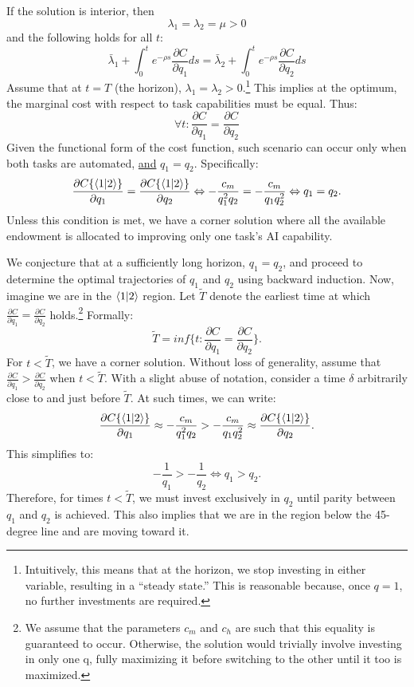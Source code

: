 \documentclass{article}
\theoremstyle{plain}
\theoremstyle{plain}
\begin{document}
If the solution is interior, then %
\[
\lambda_{1}=\lambda_{2}=\mu>0
\]
and the following holds for all $t$:
\[
\bar{\lambda}_{1}+\int_{0}^{t}e^{-\rho s}\frac{\partial C}{\partial q_{1}}ds=\bar{\lambda}_{2}+\int_{0}^{t}e^{-\rho s}\frac{\partial C}{\partial q_{2}}ds
\]
Assume that at $t=T$ (the horizon), $\lambda_{1}=\lambda_{2}>0$.\footnote{Intuitively, this means that at the horizon, we stop investing in either variable, resulting in a ``steady state.'' 
This is reasonable because, once $q=1$, no further investments are required.} 
This implies at the optimum, the marginal cost with respect to task capabilities must be equal. 
Thus:
\[
\forall t:\frac{\partial C}{\partial q_{1}}=\frac{\partial C}{\partial q_{2}}
\]
Given the functional form of the cost function, such scenario can occur only when both tasks are automated, \underline{and} $q_{1}=q_{2}$. 
Specifically:
\[
\frac{\partial C\{\langle 1|2 \rangle\}}{\partial q_{1}}=\frac{\partial C\{\langle 1|2 \rangle\}}{\partial q_{2}}\Leftrightarrow-\frac{c_{m}}{q_{1}^{2}q_{2}}=-\frac{c_{m}}{q_{1}q_{2}^{2}}\Leftrightarrow q_{1}=q_{2}.
\]
Unless this condition is met, we have a corner solution where all the available endowment is allocated to improving only one task’s AI capability. 

We conjecture that at a sufficiently long horizon, $q_{1}=q_{2}$, and proceed to determine the optimal trajectories of $q_{1}$ and $q_{2}$ using backward induction. %
Now, imagine we are in the $\langle 1|2 \rangle$ region. 
Let $\tilde{T}$ denote the earliest time at which $\frac{\partial C}{\partial q_{1}}=\frac{\partial C}{\partial q_{2}}$
holds.\footnote{We assume that the parameters $c_m$ and $c_h$ are such that this equality is guaranteed to occur.  
Otherwise, the solution would trivially involve investing in only one q, fully maximizing it before switching to the other until it too is maximized.} %
Formally: 
\[
\tilde{T}=inf\{t:\frac{\partial C}{\partial q_{1}}=\frac{\partial C}{\partial q_{2}}\}.
\]
For $t<\tilde{T}$, we have a corner solution. 
Without loss of generality, assume that $\frac{\partial C}{\partial q_{1}}>\frac{\partial C}{\partial q_{2}}$ when $t<\tilde{T}$. 
With a slight abuse of notation, consider a time $\delta$ arbitrarily close to and just before $\tilde{T}$. 
At such times, we can write:
\[
\frac{\partial C\{\langle 1|2 \rangle\}}{\partial q_{1}}\approx-\frac{c_{m}}{q_{1}^{2}q_{2}}>-\frac{c_{m}}{q_{1}q_{2}^{2}}\approx\frac{\partial C\{\langle 1|2 \rangle\}}{\partial q_{2}}.
\]
This simplifies to:
\[
-\frac{1}{q_{1}}>-\frac{1}{q_{2}}\Leftrightarrow q_{1}>q_{2}.
\]
Therefore, for times $t<\tilde{T}$, we must invest exclusively in $q_{2}$ until parity between $q_{1}$ and $q_{2}$ is achieved. 
This also implies that we are in the region below the 45-degree line and are moving toward it.
\end{document}
